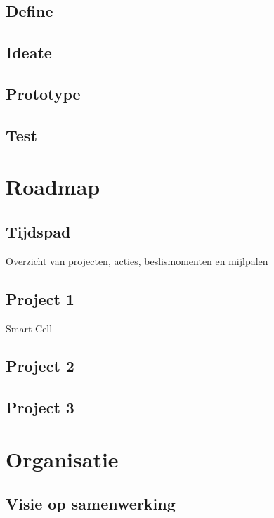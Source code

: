 \documentclass[]{book}
\begin{document}
\section{Define}\label{define}

\section{Ideate}\label{ideate}

\section{Prototype}\label{prototype}

\section{Test}\label{test}

\chapter{Roadmap}\label{roadmap}

\section{Tijdspad}\label{tijdspad}

Overzicht van projecten, acties, beslismomenten en mijlpalen

\section{Project 1}\label{project-1}

Smart Cell

\section{Project 2}\label{project-2}

\section{Project 3}\label{project-3}

\chapter{Organisatie}\label{organisatie}

\section{Visie op samenwerking}\label{visie-op-samenwerking}
\end{document}
